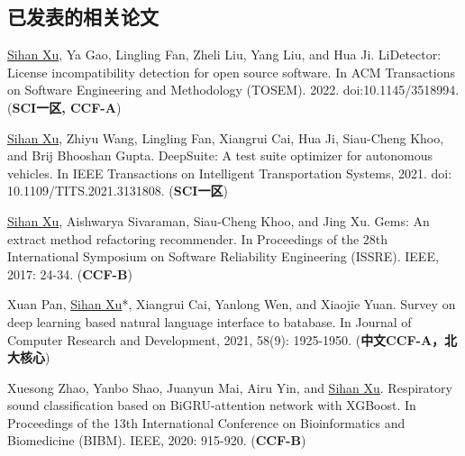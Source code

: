 \documentclass[a4paper,zihao=-4]{article}
\begin{document}
\subsection{已发表的相关论文}

\begin{enumerate}[label={[\arabic*]}]

	\item \underline{Sihan Xu}, Ya Gao, Lingling Fan, Zheli Liu, Yang Liu, and
	Hua Ji. LiDetector: License incompatibility detection for open source
	software. In ACM Transactions on Software Engineering and Methodology
	(TOSEM). 2022. doi:10.1145/3518994. (\textbf{SCI一区, CCF-A})

	\item \underline{Sihan Xu}, Zhiyu Wang, Lingling Fan, Xiangrui Cai, Hua Ji,
	Siau-Cheng Khoo, and Brij Bhooshan Gupta. DeepSuite: A test suite optimizer
	for autonomous vehicles. In IEEE Transactions on Intelligent Transportation
	Systems, 2021. doi: 10.1109/TITS.2021.3131808. (\textbf{SCI一区})

	\item \underline{Sihan Xu}, Aishwarya Sivaraman, Siau-Cheng Khoo, and Jing
	Xu. Gems: An extract method refactoring recommender. In Proceedings of the
	28th International Symposium on Software Reliability Engineering (ISSRE).
	IEEE, 2017: 24-34. (\textbf{CCF-B})

	\iffalse
	\item \underline{Sihan Xu}, Ya Gao, Xiangrui Cai, Zhiyu Wang, and Hua Ji.
Effective Multi-Fault Localization Based on Fault-Relevant Statistics. In
Proceedings of the 45th Annual Computers, Software, and Applications Conference
(COMPSAC). IEEE, 2021: 998-1003. (\textbf{CCF-C})

	\item \underline{Sihan Xu}, Sen Zhang, Weijing Wang, Xinya Cao, Chenkai Guo,
	and Jing Xu. Method name suggestion with hierarchical attention
	networks[C]//Proceedings of the 2019 ACM SIGPLAN Workshop on Partial
	Evaluation and Program Manipulation (PEPM). 2019: 10-21. (\textbf{CCF-C})
    \fi

	\item Xuan Pan, \underline{Sihan Xu}*, Xiangrui Cai, Yanlong Wen, and
	Xiaojie Yuan. Survey on deep learning based natural language interface to
	batabase. In Journal of Computer Research and Development, 2021, 58(9):
	1925-1950. (\textbf{中文CCF-A，北大核心})

	\item Xuesong Zhao, Yanbo Shao, Juanyun Mai, Airu Yin, and \underline{Sihan
	Xu}. Respiratory sound classification based on BiGRU-attention network with
	XGBoost. In Proceedings of the 13th International Conference on
	Bioinformatics and Biomedicine (BIBM). IEEE, 2020: 915-920. (\textbf{CCF-B})


\end{enumerate}
\end{document}
